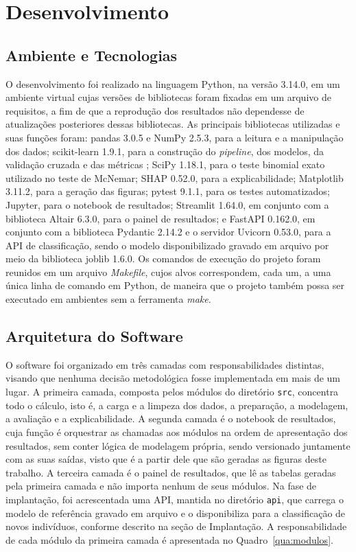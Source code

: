 \chapter{Desenvolvimento}\label{cap:desenvolvimento}

\section{Ambiente e Tecnologias}\label{sec:ambiente}
O desenvolvimento foi realizado na linguagem Python, na versão 3.14.0, em um ambiente virtual cujas versões de bibliotecas foram fixadas em um arquivo de requisitos, a fim de que a reprodução dos resultados não dependesse de atualizações posteriores dessas bibliotecas. As principais bibliotecas utilizadas e suas funções foram: pandas 3.0.5 e NumPy 2.5.3, para a leitura e a manipulação dos dados; scikit-learn 1.9.1, para a construção do \textit{pipeline}, dos modelos, da validação cruzada e das métricas \cite{pedregosa2011scikit}; SciPy 1.18.1, para o teste binomial exato utilizado no teste de McNemar; SHAP 0.52.0, para a explicabilidade; Matplotlib 3.11.2, para a geração das figuras; pytest 9.1.1, para os testes automatizados; Jupyter, para o notebook de resultados; Streamlit 1.64.0, em conjunto com a biblioteca Altair 6.3.0, para o painel de resultados; e FastAPI 0.162.0, em conjunto com a biblioteca Pydantic 2.14.2 e o servidor Uvicorn 0.53.0, para a API de classificação, sendo o modelo disponibilizado gravado em arquivo por meio da biblioteca joblib 1.6.0. Os comandos de execução do projeto foram reunidos em um arquivo \textit{Makefile}, cujos alvos correspondem, cada um, a uma única linha de comando em Python, de maneira que o projeto também possa ser executado em ambientes sem a ferramenta \textit{make}.

\section{Arquitetura do Software}\label{sec:arquitetura}
O software foi organizado em três camadas com responsabilidades distintas, visando que nenhuma decisão metodológica fosse implementada em mais de um lugar. A primeira camada, composta pelos módulos do diretório \texttt{src}, concentra todo o cálculo, isto é, a carga e a limpeza dos dados, a preparação, a modelagem, a avaliação e a explicabilidade. A segunda camada é o notebook de resultados, cuja função é orquestrar as chamadas aos módulos na ordem de apresentação dos resultados, sem conter lógica de modelagem própria, sendo versionado juntamente com as suas saídas, visto que é a partir dele que são geradas as figuras deste trabalho. A terceira camada é o painel de resultados, que lê as tabelas geradas pela primeira camada e não importa nenhum de seus módulos. Na fase de implantação, foi acrescentada uma API, mantida no diretório \texttt{api}, que carrega o modelo de referência gravado em arquivo e o disponibiliza para a classificação de novos indivíduos, conforme descrito na seção de Implantação. A responsabilidade de cada módulo da primeira camada é apresentada no Quadro~\ref{qua:modulos}.

